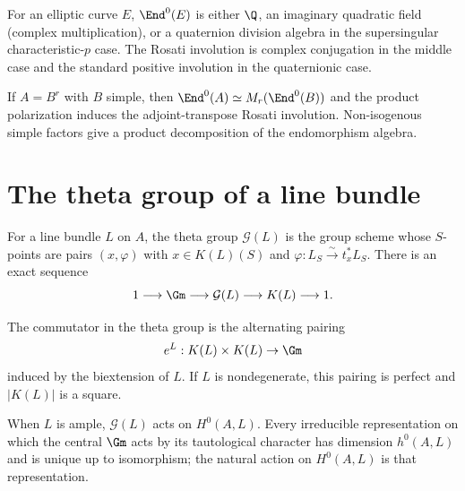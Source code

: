 \begin{example}
\label{mumford-ex-elliptic-endomorphisms}
For an elliptic curve $E$, $\End^0(E)$ is either $\Q$, an imaginary quadratic
field (complex multiplication), or a quaternion division algebra in the
supersingular characteristic-$p$ case.  The Rosati involution is complex
conjugation in the middle case and the standard positive involution in the
quaternionic case.
\notready
\end{example}

\begin{example}
\label{mumford-ex-product-endomorphisms}
If $A=B^r$ with $B$ simple, then
$\End^0(A)\simeq M_r(\End^0(B))$ and the product polarization induces the
adjoint-transpose Rosati involution.  Non-isogenous simple factors give a
product decomposition of the endomorphism algebra.
\notready
\end{example}

\section[Theta groups]{The theta group of a line bundle}
\label{mumford-IV23}

\begin{definition}
\label{mumford-def-theta-group}
For a line bundle $L$ on $A$, the theta group $\mathcal G(L)$ is the group
scheme whose $S$-points are pairs $(x,\varphi)$ with $x\in K(L)(S)$ and
$\varphi:L_S\xrightarrow{\sim}t_x^*L_S$.  There is an exact sequence
\[
 1\longrightarrow\Gm\longrightarrow\mathcal G(L)\longrightarrow K(L)
 \longrightarrow1.
\]
\notready
\end{definition}

\begin{proposition}
\label{mumford-prop-theta-commutator}
The commutator in the theta group is the alternating pairing
\[
 e^L:K(L)\times K(L)\to\Gm
\]
induced by the biextension of $L$.  If $L$ is nondegenerate, this pairing is
perfect and $|K(L)|$ is a square.
\notready
\end{proposition}

\begin{theorem}
\label{mumford-thm-theta-representation}
When $L$ is ample, $\mathcal G(L)$ acts on $H^0(A,L)$.  Every irreducible
representation on which the central $\Gm$ acts by its tautological character
has dimension $h^0(A,L)$ and is unique up to isomorphism; the natural action on
$H^0(A,L)$ is that representation.
\notready
\end{theorem}

